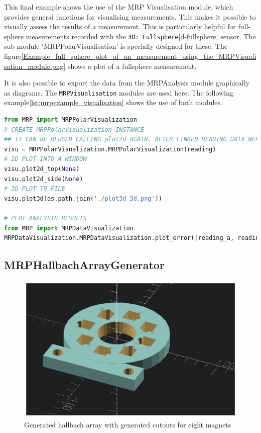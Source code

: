 This final example shows the use of the MRP Visualisation module, which
provides general functions for visualising measurements. This makes it
possible to visually assess the results of a measurement. This is
particularly helpful for full-sphere measurements recorded with the
\passthrough{\lstinline!3D: Fullsphere!}\ref{d-fullsphere} sensor. The
sub-module `MRPPolarVisualisation' is specially designed for these. The
figure\ref{Example_full_sphere_plot_of_an_measurement_using_the_MRPVisualisation_module.png}
shows a plot of a fullsphere measurement.

It is also possible to export the data from the MRPAnalysis module
graphically as diagrams. The \passthrough{\lstinline!MRPVisualisation!}
modules are used here. The following
example\ref{lst:mrpexample_visualisation} shows the use of both modules.

\begin{lstlisting}[language=Python, caption={MRPVisualisation example which plots a fullsphere to an image file}, label=lst:mrpexample_visualisation]
from MRP import MRPPolarVisualization
# CREATE MRPPolarVisualization INSTANCE
## IT CAN BE REUSED CALLING plot2d AGAIN, AFTER LINKED READING DATA WERE MODIFIED
visu = MRPPolarVisualization.MRPPolarVisualization(reading)
# 2D PLOT INTO A WINDOW
visu.plot2d_top(None)
visu.plot2d_side(None)
# 3D PLOT TO FILE
visu.plot3d(os.path.join('./plot3d_3d.png'))

# PLOT ANALYSIS RESULTS
from MRP import MRPDataVisualization
MRPDataVisualization.MRPDataVisualization.plot_error([reading_a, reading_b, reading_c])
\end{lstlisting}

\hypertarget{mrphallbacharraygenerator}{%
\subsection{MRPHallbachArrayGenerator}\label{mrphallbacharraygenerator}}

\begin{figure}
\centering
\includegraphics{./generated_images/border_Generated_hallbach_array_with_generated_cutouts_for_eight_magnets.png}
\caption{Generated hallbach array with generated cutouts for eight
magnets
\label{Generated_hallbach_array_with_generated_cutouts_for_eight_magnets.png}}
\end{figure}

